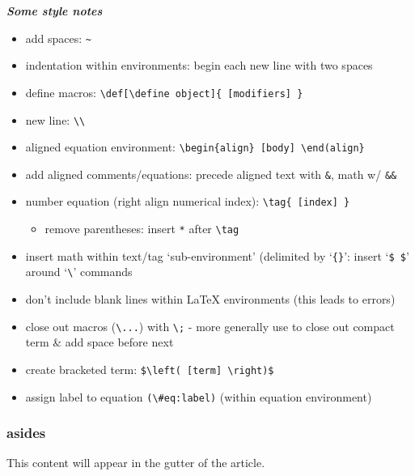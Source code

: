 \documentclass[
]{article}
\providecommand{\tightlist}{%
  \setlength{\itemsep}{0pt}\setlength{\parskip}{0pt}}
\begin{document}
\textbf{\emph{Some style notes}}

\begin{itemize}
\item
  add spaces: \texttt{\textasciitilde{}}
\item
  indentation within environments: begin each new line with two spaces
\item
  define macros:
  \texttt{\textbackslash{}def{[}\textbackslash{}define\ object{]}\{\ {[}modifiers{]}\ \}}
\item
  new line: \texttt{\textbackslash{}\textbackslash{}}
\item
  aligned equation environment:
  \texttt{\textbackslash{}begin\{align\}\ {[}body{]}\ \textbackslash{}end(align\}}
\item
  add aligned comments/equations: precede aligned text with \texttt{\&},
  math w/ \texttt{\&\&}
\item
  number equation (right align numerical index):
  \texttt{\textbackslash{}tag\{\ {[}index{]}\ \}}

  \begin{itemize}
  \tightlist
  \item
    remove parentheses: insert \texttt{*} after
    \texttt{\textbackslash{}tag}
  \end{itemize}
\item
  insert math within text/tag `sub-environment' (delimited by
  `\texttt{\{\}}': insert `\texttt{\$\ \$}' around
  `\texttt{\textbackslash{}}' commands
\item
  don't include blank lines within LaTeX environments (this leads to
  errors)
\item
  close out macros (\texttt{\textbackslash{}...}) with
  \texttt{\textbackslash{};} - more generally use to close out compact
  term \& add space before next
\item
  create bracketed term:
  \texttt{\$\textbackslash{}left(\ {[}term{]}\ \textbackslash{}right)\$}
\item
  assign label to equation \texttt{(\textbackslash{}\#eq:label)} (within
  equation environment)
\end{itemize}

\hypertarget{asides}{%
\subsubsection{asides}\label{asides}}

This content will appear in the gutter of the article.
\end{document}
